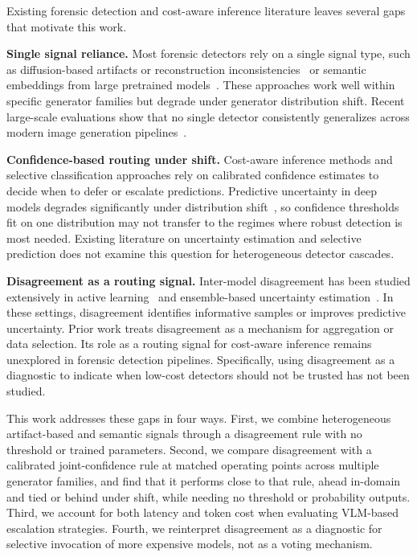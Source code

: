 \documentclass{ieeeaccess}
\begin{document}
Existing forensic detection and cost-aware inference literature leaves several gaps that motivate this work.

\textbf{Single signal reliance.} Most forensic detectors rely on a single signal type, such as diffusion-based artifacts or reconstruction inconsistencies~\cite{Corvi_2023_ICASSP} or semantic embeddings from large pretrained models~\cite{cozzolino2023raising}. These approaches work well within specific generator families but degrade under generator distribution shift. Recent large-scale evaluations show that no single detector consistently generalizes across modern image generation pipelines~\cite{epstein2023online, cozzolino2023raising}.

\textbf{Confidence-based routing under shift.} Cost-aware inference methods and selective classification approaches rely on calibrated confidence estimates to decide when to defer or escalate predictions. Predictive uncertainty in deep models degrades significantly under distribution shift~\cite{ovadia2019can}, so confidence thresholds fit on one distribution may not transfer to the regimes where robust detection is most needed. Existing literature on uncertainty estimation and selective prediction does not examine this question for heterogeneous detector cascades.

\textbf{Disagreement as a routing signal.} Inter-model disagreement has been studied extensively in active learning~\cite{seung1992query} and ensemble-based uncertainty estimation~\cite{lakshminarayanan2017simple}. In these settings, disagreement identifies informative samples or improves predictive uncertainty. Prior work treats disagreement as a mechanism for aggregation or data selection. Its role as a routing signal for cost-aware inference remains unexplored in forensic detection pipelines. Specifically, using disagreement as a diagnostic to indicate when low-cost detectors should not be trusted has not been studied.

This work addresses these gaps in four ways. First, we combine heterogeneous artifact-based and semantic signals through a disagreement rule with no threshold or trained parameters. Second, we compare disagreement with a calibrated joint-confidence rule at matched operating points across multiple generator families, and find that it performs close to that rule, ahead in-domain and tied or behind under shift, while needing no threshold or probability outputs. Third, we account for both latency and token cost when evaluating VLM-based escalation strategies. Fourth, we reinterpret disagreement as a diagnostic for selective invocation of more expensive models, not as a voting mechanism.
\end{document}
